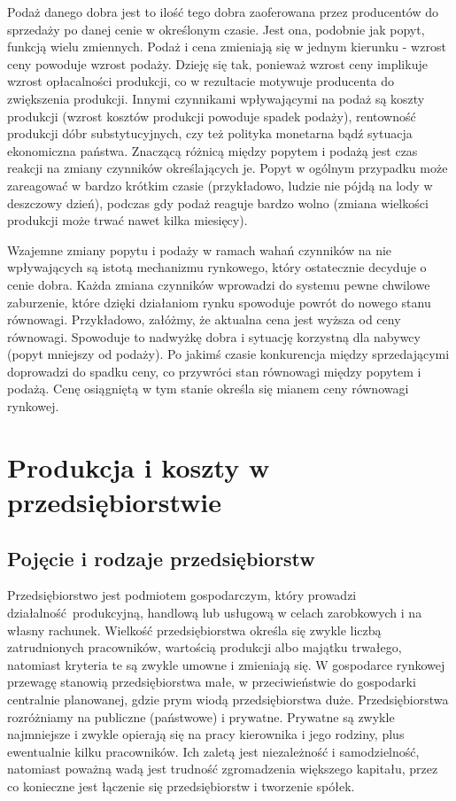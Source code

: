 \documentclass[12pt]{extarticle}
\begin{document}
Podaż danego dobra jest to ilość tego dobra zaoferowana przez producentów do sprzedaży po danej cenie w określonym czasie. Jest ona, podobnie jak popyt, funkcją wielu zmiennych. Podaż i cena zmieniają się w jednym kierunku - wzrost ceny powoduje wzrost podaży. Dzieję się tak, ponieważ wzrost ceny implikuje wzrost opłacalności produkcji, co w rezultacie motywuje producenta do zwiększenia produkcji. Innymi czynnikami wpływającymi na podaż są koszty produkcji (wzrost kosztów produkcji powoduje spadek podaży), rentowność produkcji dóbr substytucyjnych, czy też polityka monetarna bądź sytuacja ekonomiczna państwa. Znaczącą różnicą między popytem i podażą jest czas reakcji na zmiany czynników określających je. Popyt w ogólnym przypadku może zareagować w bardzo krótkim czasie (przykładowo, ludzie nie pójdą na lody w deszczowy dzień), podczas gdy podaż reaguje bardzo wolno (zmiana wielkości produkcji może trwać nawet kilka miesięcy).


Wzajemne zmiany popytu i podaży w ramach wahań czynników na nie wpływających są istotą mechanizmu rynkowego, który ostatecznie decyduje o cenie dobra. Każda zmiana czynników wprowadzi do systemu pewne chwilowe zaburzenie, które dzięki działaniom rynku spowoduje powrót do nowego stanu równowagi. Przykładowo, załóżmy, że aktualna cena jest wyższa od ceny równowagi. Spowoduje to nadwyżkę dobra i sytuację korzystną dla nabywcy (popyt mniejszy od podaży). Po jakimś czasie konkurencja między sprzedającymi doprowadzi do spadku ceny, co przywróci stan równowagi między popytem i podażą. Cenę osiągniętą w tym stanie określa się mianem ceny równowagi rynkowej.



\section{Produkcja i koszty w przedsiębiorstwie}

\subsection{Pojęcie i rodzaje przedsiębiorstw}

Przedsiębiorstwo jest podmiotem gospodarczym, który prowadzi działalność produkcyjną, handlową lub usługową w celach zarobkowych i na własny rachunek. Wielkość przedsiębiorstwa określa się zwykle liczbą zatrudnionych pracowników, wartością produkcji albo majątku trwałego, natomiast kryteria te są zwykle umowne i zmieniają się. W gospodarce rynkowej przewagę stanowią przedsiębiorstwa małe, w przeciwieństwie do gospodarki centralnie planowanej, gdzie prym wiodą przedsiębiorstwa duże. Przedsiębiorstwa rozróżniamy na publiczne (państwowe) i prywatne. Prywatne są zwykle najmniejsze i zwykle opierają się na pracy kierownika i jego rodziny, plus ewentualnie kilku pracowników. Ich zaletą jest niezależność i samodzielność, natomiast poważną wadą jest trudność zgromadzenia większego kapitału, przez co konieczne jest łączenie się przedsiębiorstw i tworzenie spółek.
\end{document}
